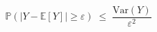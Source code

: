 \documentclass[preview]{standalone}
\begin{document}
\begin{align*}
\mathbb{P}\!\left(|Y-\mathbb{E}[Y]|\geq\varepsilon\right) \;\leq\; \dfrac{\mathrm{Var}(Y)}{\varepsilon^2}
\end{align*}
\end{document}
